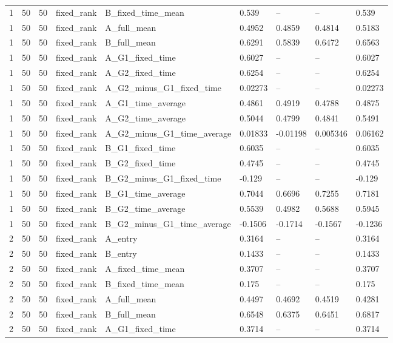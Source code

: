 \begin{longtable}{lllllllll}
1 & 50 & 50 & fixed\_rank & B\_fixed\_time\_mean & 0.539 & -- & -- & 0.539 \\
1 & 50 & 50 & fixed\_rank & A\_full\_mean & 0.4952 & 0.4859 & 0.4814 & 0.5183 \\
1 & 50 & 50 & fixed\_rank & B\_full\_mean & 0.6291 & 0.5839 & 0.6472 & 0.6563 \\
1 & 50 & 50 & fixed\_rank & A\_G1\_fixed\_time & 0.6027 & -- & -- & 0.6027 \\
1 & 50 & 50 & fixed\_rank & A\_G2\_fixed\_time & 0.6254 & -- & -- & 0.6254 \\
1 & 50 & 50 & fixed\_rank & A\_G2\_minus\_G1\_fixed\_time & 0.02273 & -- & -- & 0.02273 \\
1 & 50 & 50 & fixed\_rank & A\_G1\_time\_average & 0.4861 & 0.4919 & 0.4788 & 0.4875 \\
1 & 50 & 50 & fixed\_rank & A\_G2\_time\_average & 0.5044 & 0.4799 & 0.4841 & 0.5491 \\
1 & 50 & 50 & fixed\_rank & A\_G2\_minus\_G1\_time\_average & 0.01833 & -0.01198 & 0.005346 & 0.06162 \\
1 & 50 & 50 & fixed\_rank & B\_G1\_fixed\_time & 0.6035 & -- & -- & 0.6035 \\
1 & 50 & 50 & fixed\_rank & B\_G2\_fixed\_time & 0.4745 & -- & -- & 0.4745 \\
1 & 50 & 50 & fixed\_rank & B\_G2\_minus\_G1\_fixed\_time & -0.129 & -- & -- & -0.129 \\
1 & 50 & 50 & fixed\_rank & B\_G1\_time\_average & 0.7044 & 0.6696 & 0.7255 & 0.7181 \\
1 & 50 & 50 & fixed\_rank & B\_G2\_time\_average & 0.5539 & 0.4982 & 0.5688 & 0.5945 \\
1 & 50 & 50 & fixed\_rank & B\_G2\_minus\_G1\_time\_average & -0.1506 & -0.1714 & -0.1567 & -0.1236 \\
2 & 50 & 50 & fixed\_rank & A\_entry & 0.3164 & -- & -- & 0.3164 \\
2 & 50 & 50 & fixed\_rank & B\_entry & 0.1433 & -- & -- & 0.1433 \\
2 & 50 & 50 & fixed\_rank & A\_fixed\_time\_mean & 0.3707 & -- & -- & 0.3707 \\
2 & 50 & 50 & fixed\_rank & B\_fixed\_time\_mean & 0.175 & -- & -- & 0.175 \\
2 & 50 & 50 & fixed\_rank & A\_full\_mean & 0.4497 & 0.4692 & 0.4519 & 0.4281 \\
2 & 50 & 50 & fixed\_rank & B\_full\_mean & 0.6548 & 0.6375 & 0.6451 & 0.6817 \\
2 & 50 & 50 & fixed\_rank & A\_G1\_fixed\_time & 0.3714 & -- & -- & 0.3714 \\

\end{longtable}
